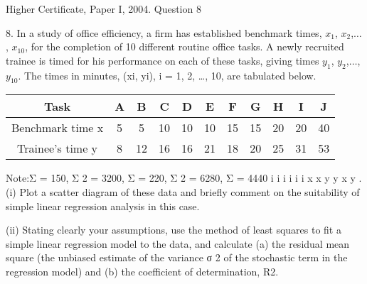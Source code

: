\documentclass[a4paper,12pt]{article}
\begin{document}
Higher Certificate, Paper I, 2004. Question 8
\begin{framed}



8. In a study of office efficiency, a firm has established benchmark times, $x_1$, $x_2$,$\ldots$, $x_{10}$,
for the completion of 10 different routine office tasks. A newly recruited trainee is
timed for his performance on each of these tasks, giving times $y_1$, $y_2$,$\ldots$, $y_{10}$. The
times in minutes, (xi, yi), i = 1, 2, …, 10, are tabulated below.

\begin{center}
\begin{tabular}{|c|c|c|c|c|c|c|c|c|c|c|}
Task & A & B & C & D & E & F & G & H & I & J \\ \hline
Benchmark time x & 5 & 5 & 10&  10&  10 & 15 & 15&  20 & 20&  40 \\ \hline
Trainee's time y & 8 & 12&  16&  16& 21& 18 & 20&  25&  31& 53 \\ \hline
\end{tabular}
\end{center}



Note:Σ = 150, Σ 2 = 3200, Σ = 220, Σ 2 = 6280, Σ = 4440 i i i i i i x x y y x y .
(i) Plot a scatter diagram of these data and briefly comment on the suitability of
simple linear regression analysis in this case.
\end{framed}

\begin{framed}
(ii) Stating clearly your assumptions, use the method of least squares to fit a
simple linear regression model to the data, and calculate (a) the residual mean
square (the unbiased estimate of the variance σ 2 of the stochastic term in the
regression model) and (b) the coefficient of determination, R2.
\end{framed}
\end{document}
